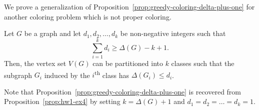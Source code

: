 We prove a generalization of Proposition~\ref{prop:greedy-coloring-delta-plus-one} for another coloring problem which is not proper coloring.

\begin{proposition} \label{prop:hw1-ex4}
Let \(G\) be a graph and let \(d_1, d_2, \ldots, d_k\) be non-negative integers such that
\begin{equation*}
    \sum_{i=1}^k d_i \geq \Delta(G)-k+1.
\end{equation*}
Then, the vertex set \(V(G)\) can be partitioned into \(k\) classes such that
the subgraph \(G_i\) induced by the \(i\)\textsuperscript{th} class has \(\Delta\left(G_i\right) \leq d_i\).
\end{proposition}

Note that Proposition~\ref{prop:greedy-coloring-delta-plus-one} is recovered from Proposition~\ref{prop:hw1-ex4} by setting \(k = \Delta(G) + 1\) and \(d_1 = d_2 = \ldots = d_k = 1\).

